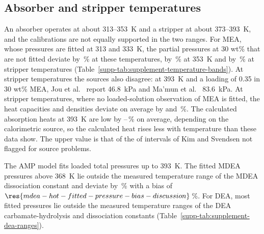 \subsection{Absorber and stripper temperatures}\label{sec:discussion-bands}
An absorber operates at about 313--\SI{353}{\kelvin} and a stripper at about 373--\SI{393}{\kelvin}, and the calibrations are not equally supported in the two ranges.
For MEA, whose pressures are fitted at 313 and \SI{333}{\kelvin}, the \COtwo partial pressures at 30 wt\% that are not fitted deviate by \,\% at these temperatures, by \,\% at \SI{353}{\kelvin} and by \,\% at stripper temperatures (Table~\ref{supp-tab:supplement-temperature-bands}).
At stripper temperatures the sources also disagree: at \SI{393}{\kelvin} and a loading of 0.35 in 30 wt\% MEA, Jou et al.\ \cite{Jou1995} report \SI{46.8}{\kilo\pascal} and Ma'mun et al.\ \cite{Mamun2005} \SI{83.6}{\kilo\pascal}.
At stripper temperatures, where no loaded-solution observation of MEA is fitted, the heat capacities and densities deviate on average by  and \,\%.
The calculated absorption heats at \SI{393}{\kelvin} are low by --\,\% on average, depending on the calorimetric source, so the calculated heat rises less with temperature than these data show.
The upper value is that of the  of  intervals of Kim and Svendsen not flagged for source problems.

The AMP model fits loaded total pressures up to \SI{393}{\kelvin}.
The fitted MDEA pressures above \SI{368}{\kelvin} lie outside the measured temperature range of the MDEA dissociation constant and deviate by \,\% with a bias of $\res{mdea-hot-fitted-pressure-bias-discussion}$\,\%.
For DEA, most fitted pressures lie outside the measured temperature ranges of the DEA carbamate-hydrolysis and dissociation constants (Table~\ref{supp-tab:supplement-dea-ranges}).

